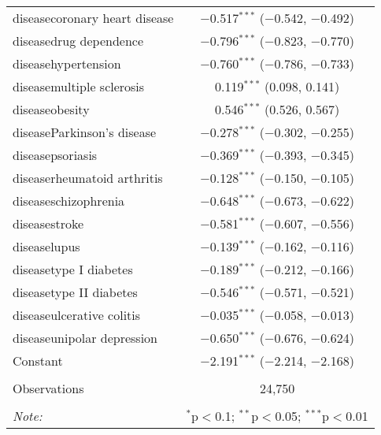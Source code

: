 \begin{table}[!htbp]
\begin{tabular}{@{\extracolsep{5pt}}lc}
  diseasecoronary heart disease & $-$0.517$^{***}$ ($-$0.542, $-$0.492) \\ 
  diseasedrug dependence & $-$0.796$^{***}$ ($-$0.823, $-$0.770) \\ 
  diseasehypertension & $-$0.760$^{***}$ ($-$0.786, $-$0.733) \\ 
  diseasemultiple sclerosis & 0.119$^{***}$ (0.098, 0.141) \\ 
  diseaseobesity & 0.546$^{***}$ (0.526, 0.567) \\ 
  diseaseParkinson's disease & $-$0.278$^{***}$ ($-$0.302, $-$0.255) \\ 
  diseasepsoriasis & $-$0.369$^{***}$ ($-$0.393, $-$0.345) \\ 
  diseaserheumatoid arthritis & $-$0.128$^{***}$ ($-$0.150, $-$0.105) \\ 
  diseaseschizophrenia & $-$0.648$^{***}$ ($-$0.673, $-$0.622) \\ 
  diseasestroke & $-$0.581$^{***}$ ($-$0.607, $-$0.556) \\ 
  diseaselupus & $-$0.139$^{***}$ ($-$0.162, $-$0.116) \\ 
  diseasetype I diabetes & $-$0.189$^{***}$ ($-$0.212, $-$0.166) \\ 
  diseasetype II diabetes & $-$0.546$^{***}$ ($-$0.571, $-$0.521) \\ 
  diseaseulcerative colitis & $-$0.035$^{***}$ ($-$0.058, $-$0.013) \\ 
  diseaseunipolar depression & $-$0.650$^{***}$ ($-$0.676, $-$0.624) \\ 
  Constant & $-$2.191$^{***}$ ($-$2.214, $-$2.168) \\ 
 \hline \\[-1.8ex] 
Observations & 24,750 \\ 
\hline 
\hline \\[-1.8ex] 
\textit{Note:}  & \multicolumn{1}{r}{$^{*}$p$<$0.1; $^{**}$p$<$0.05; $^{***}$p$<$0.01} \\ 
\end{tabular} 
\end{table} 
